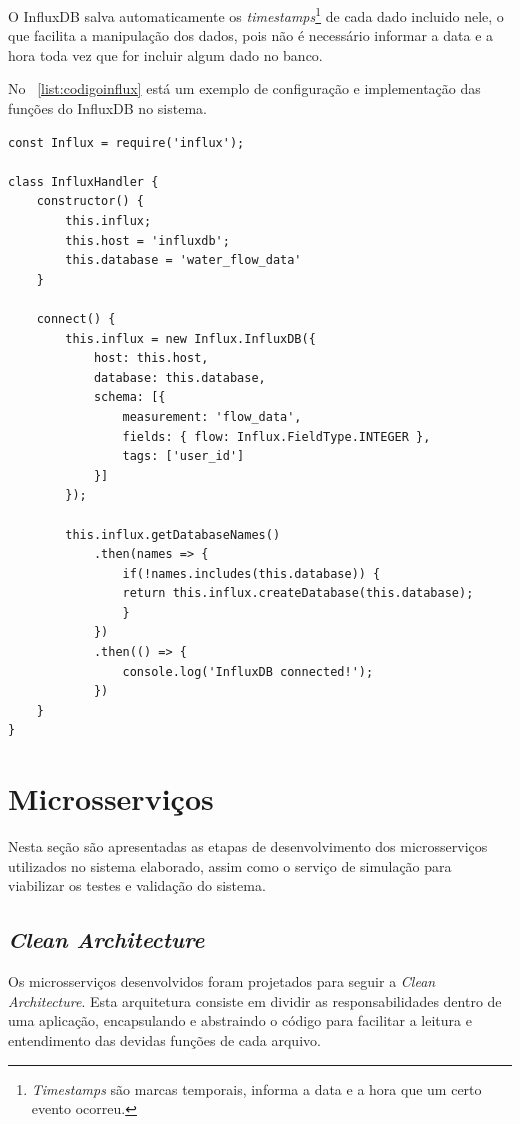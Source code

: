 O InfluxDB salva automaticamente os \textit{timestamps}\footnote{\textit{Timestamps} são marcas temporais, informa a data e a hora que um certo evento ocorreu.} de cada dado incluido nele, o que facilita a manipulação dos dados, pois não é necessário informar a data e a hora toda vez que for incluir algum dado no banco.

No \lstlistingname\ \ref{list:codigoinflux} está um exemplo de configuração e implementação das funções do InfluxDB no sistema.

\newpage


\begin{lstlisting}[label=list:codigoinflux, caption=Exemplo do código de configuração do InfluxDB]
const Influx = require('influx');

class InfluxHandler {
	constructor() {
		this.influx;
		this.host = 'influxdb';
		this.database = 'water_flow_data'
	}
	
	connect() {
		this.influx = new Influx.InfluxDB({
			host: this.host,
			database: this.database,
			schema: [{
				measurement: 'flow_data',
				fields: { flow: Influx.FieldType.INTEGER },
				tags: ['user_id']
			}]
		});
		
		this.influx.getDatabaseNames()
			.then(names => {
				if(!names.includes(this.database)) {
				return this.influx.createDatabase(this.database);
				}
			})
			.then(() => {
				console.log('InfluxDB connected!');
			})
	}
}
\end{lstlisting}

\newpage

\section{Microsserviços}

Nesta seção são apresentadas as etapas de desenvolvimento dos microsserviços utilizados no sistema elaborado, assim como o serviço de simulação para viabilizar os testes e validação do sistema.

\subsection{\textit{Clean Architecture}}

Os microsserviços desenvolvidos foram projetados para seguir a \textit{Clean Architecture}. Esta arquitetura consiste em dividir as responsabilidades dentro de uma aplicação, encapsulando e abstraindo o código para facilitar a leitura e entendimento das devidas funções de cada arquivo.

